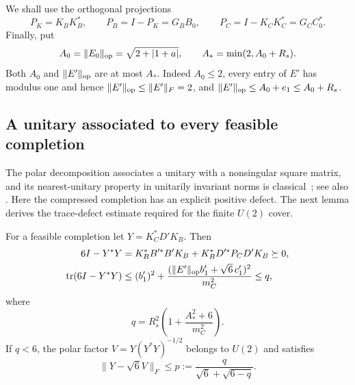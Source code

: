 We shall use the orthogonal projections
\begin{equation}
\label{completion:projections}
 P_K=K_BK_B^*,\qquad P_B=I-P_K=G_BB_0,\qquad
 P_C=I-K_CK_C^*=G_CC_0^*.
\end{equation}
Finally, put
\begin{equation}
\label{completion:A-bounds}
 A_0=\lVert E_0\rVert_{\rm op}=\sqrt{2+|1+a|},\qquad
 A_* =\min(2,A_0+R_s).
\end{equation}
Both $A_0$ and $\lVert E'\rVert_{\rm op}$ are at most $A_*$.
Indeed $A_0\le2$, every entry of $E'$ has modulus one and hence
$\lVert E'\rVert_{\rm op}\le\lVert E'\rVert_F=2$, and
$\lVert E'\rVert_{\rm op}\le A_0+e_1\le A_0+R_s$.

\subsection{A unitary associated to every feasible completion}

The polar decomposition associates a unitary with a nonsingular square
matrix, and its nearest-unitary property in unitarily invariant norms is
classical~\cite[Theorem~1]{FanHoffman1955}; see also
\cite[Theorem~1.1 and Corollary~2.3]{Higham1986Polar}. Here the compressed
completion has an explicit positive defect. The next lemma derives the
trace-defect estimate required for the finite $U(2)$ cover.


\begin{lemma}
\label{completion:polar}
For a feasible completion let $Y=K_C^*D'K_B$.  Then
\begin{align}
\label{completion:deficit-identity}
 6I-Y^*Y
 &=K_B^*B'^*B'K_B+
   K_B^*D'^*P_CD'K_B\succeq0,\\
\label{completion:deficit-bound}
 \operatorname{tr}(6I-Y^*Y)
 &\le (b_1')^2+
 \frac{(\lVert E'\rVert_{\rm op}b_1'+\sqrt6\,c_1')^2}{m_C^2}
 \le q,
\end{align}
where
\begin{equation}
\label{completion:q-and-p}
 q=R_s^2\left(1+\frac{A_*^2+6}{m_C^2}\right).
\end{equation}
If $q<6$, the polar factor
$V=Y(Y^*Y)^{-1/2}$ belongs to $U(2)$ and satisfies
\begin{equation}
\label{completion:polar-bound}
 \lVert Y-\sqrt6 V\rVert_F\le
 p:=\frac{q}{\sqrt6+\sqrt{6-q}}.
\end{equation}
\end{lemma}

